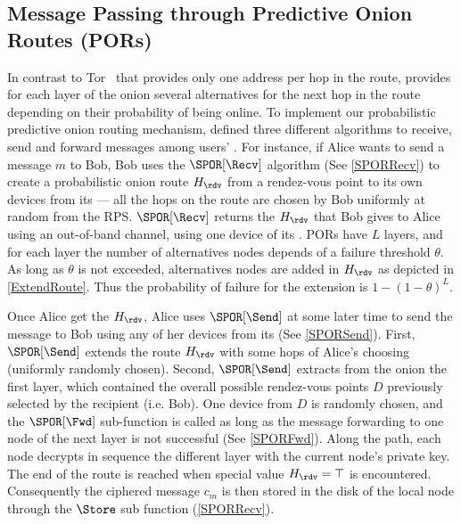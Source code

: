 
\subsection{Message Passing through Predictive Onion Routes (PORs)}
\label{sec:message_passing}



In contrast to Tor~\cite{Tor} that provides only one address per hop
in the route, \name provides for each layer of the onion several
alternatives for the next hop in the route depending on their
probability of being online. To implement our  probabilistic
predictive onion routing mechanism, \name defined three different algorithms to
receive, send and forward messages among users' \squad. For instance,
if Alice wants to send a message \(m\) to Bob, Bob uses the
\(\SPOR[\Recv]\) algorithm (See \cref{SPORRecv}) to create a probabilistic onion route \(H_\rdv\) from
 a rendez-vous point to its own devices from its \squad --- all the hops on the route are 
chosen by Bob uniformly at random from the RPS. \(\SPOR[\Recv]\)
returns the \(H_\rdv\) that Bob gives to Alice using an
out-of-band channel, \eg using one device of its \squad.
PORs have \(L\) layers, and for each layer the number of
alternatives nodes depends of a failure threshold \(\theta\). 
As long as \(\theta\) is not exceeded, alternatives nodes are added in
\(H_\rdv\) as depicted in \cref{ExtendRoute}. Thus the probability of
failure for the extension is \(1 - (1 - \theta)^L\).


Once Alice get the \(H_\rdv\), Alice uses \(\SPOR[\Send]\) at some
later time to send the message to Bob using any of her devices from
its \squad (See \cref{SPORSend}). First, \(\SPOR[\Send]\) extends the route
\(H_\rdv\) with some hops of Alice's choosing (uniformly randomly
chosen). Second, \(\SPOR[\Send]\) extracts from the onion the first
layer, which contained the overall
possible rendez-vous points $D$ previously selected by the recipient (i.e. Bob).
One device from $D$ is randomly chosen, and the \(\SPOR[\Fwd]\)
sub-function is called as long as the message forwarding to one node of
the next layer is not successful (See \cref{SPORFwd}). Along the path, each node decrypts
in sequence the different layer with the current node’s private key. 
The end of the route is reached when special value \(H_\rdv = \top\) is
encountered. Consequently the ciphered message \(c_m\) is then stored
in the disk of the local node through the \(\Store\) sub function 
(\cref{SPORRecv}).

